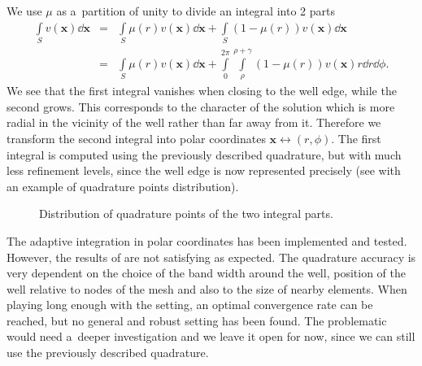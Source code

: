 We use $\mu$ as a~partition of unity to divide an integral into 2 parts
\begin{eqnarray} 
      \int\limits_S v(\mathbf{x}) \dd \mathbf{x} &=& \int\limits_S \mu(r) v(\mathbf{x}) \dd \mathbf{x} + \int\limits_S (1-\mu(r)) v(\mathbf{x}) \dd \mathbf{x} \nonumber\\
      &=& \int\limits_S \mu(r) v(\mathbf{x}) \dd \mathbf{x} + \int\limits_0^{2\pi} \int\limits_\rho^{\rho+\gamma} (1-\mu(r)) v(\mathbf{x}) r \dd r \dd \phi.
\end{eqnarray}
We see that the first integral vanishes when closing to the well edge, while the second grows. This corresponds
to the character of the solution which is more radial in the vicinity of the well rather than far away from it.
Therefore we transform the second integral into polar coordinates $\mathbf{x} \longleftrightarrow (r,\phi)$. 
The first integral is computed using the previously described quadrature, but with much less refinement
levels, since the well edge is now represented precisely (see  with
an example of quadrature points distribution).
%
\begin{figure}[!htb]
  \centering    
  \hspace{0pt}
  \caption[Polar quadrature points]
  {Distribution of quadrature points of the two integral parts.
  }
  \label{fig:polar_quad_points}
\end{figure} 

The adaptive integration in polar coordinates has been implemented and tested.
However, the results of are not satisfying as expected. The quadrature accuracy is very dependent on the choice of
the band width around the well, position of the well relative to nodes of the mesh and also to the size of nearby elements.
When playing long enough with the setting, an optimal convergence rate can be reached, but no general and robust 
setting has been found. The problematic would need a~deeper investigation and we leave it open for now, since
we can still use the previously described quadrature.


